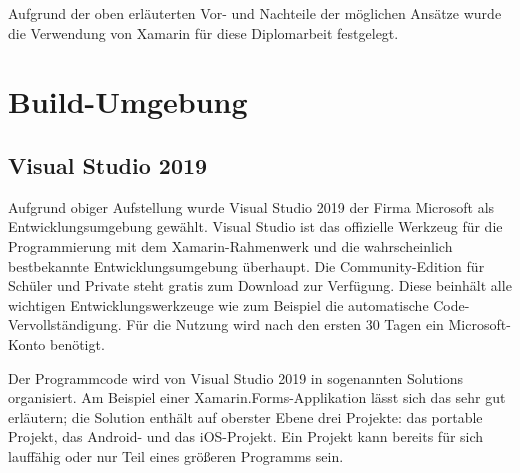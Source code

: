 Aufgrund der oben erläuterten Vor- und Nachteile der möglichen Ansätze wurde die Verwendung von Xamarin für diese Diplomarbeit festgelegt.

\section{Build-Umgebung}
\subsection{Visual Studio 2019}
Aufgrund obiger Aufstellung wurde Visual Studio 2019 der Firma Microsoft als Entwicklungsumgebung gewählt.
Visual Studio ist das offizielle Werkzeug für die Programmierung mit dem Xamarin-Rahmenwerk und die wahrscheinlich bestbekannte Entwicklungsumgebung überhaupt.
Die Community-Edition für Schüler und Private steht gratis zum Download zur Verfügung.
Diese beinhält alle wichtigen Entwicklungswerkzeuge wie zum Beispiel die automatische Code-Vervollständigung.
Für die Nutzung wird nach den ersten 30 Tagen ein Microsoft-Konto benötigt.\par

Der Programmcode wird von Visual Studio 2019 in sogenannten Solutions organisiert.
Am Beispiel einer Xamarin.Forms-Applikation lässt sich das sehr gut erläutern;
die Solution enthält auf oberster Ebene drei Projekte: das portable Projekt, das Android- und das iOS-Projekt.
Ein Projekt kann bereits für sich lauffähig oder nur Teil eines größeren Programms sein.\par

